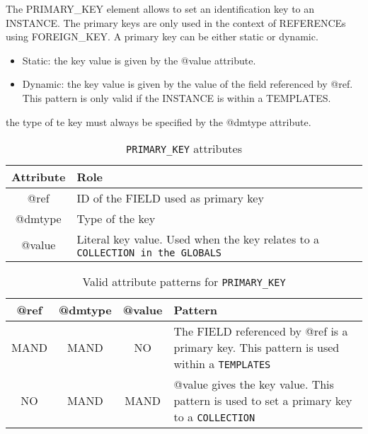 The PRIMARY\_KEY element allows to set an identification key to an INSTANCE. The primary keys are only used in the context of REFERENCEs using FOREIGN\_KEY.
A primary key can be either static or dynamic.

\begin{itemize}
    \item Static: the key value is given by the @value attribute.
    \item Dynamic: the key value is given by the value of the field referenced by @ref. 
    This pattern is only valid if the INSTANCE is within a TEMPLATES. 
\end{itemize}

the type of te key must always be specified by the @dmtype attribute. 

\begin{table}[!htbp]
\small
\centering
\begin{tabulary}{\linewidth}{|c|J|}       
       \hline 
            \textbf{Attribute} & 
            \textbf {Role}\\
       \hline         \hline  
            @ref& 
            ID of the FIELD used as primary key \\
        \hline 
            @dmtype & 
            Type of the key \\
        \hline 
            @value & 
            Literal key value. Used when the key relates to a \texttt{COLLECTION in the \texttt{GLOBALS}} \\
        \hline 
     \end{tabulary}
     \caption{\texttt{PRIMARY\_KEY} attributes} 
     \label{tbl:primarykey-att}
 \end{table}

\begin{table}[!htbp]
\small
\centering
\begin{tabulary}{\linewidth}{|c|c|c|J|}
    \hline 
        \textbf{@ref} &
        \textbf{@dmtype} &
        \textbf{@value} &
        \textbf{Pattern}\\
    \hline      \hline  
        MAND &           
        MAND &           
        NO &           
        The FIELD referenced by @ref is a primary key. This pattern is used within a \texttt{TEMPLATES} \\
    \hline     
        NO &           
        MAND &           
        MAND &           
        @value gives the key value. This pattern is used to set a primary key to a \texttt{COLLECTION}\\
   \hline 
\end{tabulary}
     \caption{Valid attribute patterns for  \texttt{PRIMARY\_KEY}}
     \label{tbl:primarykey-pattern}
\end{table}
